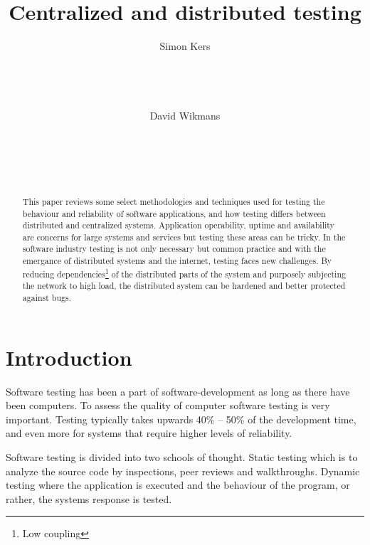 \documentclass[10pt]{sensys-abstract}
\author{
%
\alignauthor Simon Kers\\
   \email{\url{skers@kth.se}}\\
   \affaddr{School of Technology and Health}\\
   \affaddr{KTH Royal Institute of Technology}\\
   \affaddr{February 2013}\\
\alignauthor David Wikmans\\
   \email{\url{wikmans@kth.se}}\\
   \affaddr{School of Technology and Health}\\
   \affaddr{KTH Royal Institute of Technology}\\
   \affaddr{February 2013}\\
}
\title{Centralized and distributed testing}
\begin{document}
\maketitle

\begin{abstract}
\noindent
This paper reviews some select methodologies and techniques used for testing the behaviour and reliability of software applications, and how testing differs between distributed and centralized systems.
Application operability, uptime and availability are concerns for large systems and services but testing these areas can be tricky.
In the software industry testing is not only necessary but common practice and with the emergance of distributed systems and the internet, testing faces new challenges.
By reducing dependencies\footnote{Low coupling} of the distributed parts of the system and purposely subjecting the network to high load, the distributed system can be hardened and better protected against bugs.

\end{abstract}




\section{Introduction}
  \label{sec:intro}
\noindent
Software testing has been a part of software-development as long as there have been computers. To assess the quality of computer software testing is very important. Testing typically takes upwards 40\% -- 50\% of the development time, and even more for systems that require higher levels of reliability. \cite{testing_techniques}

Software testing is divided into two schools of thought. Static testing which is to analyze the source code by inspections, peer reviews and walkthroughs. Dynamic testing where the application is executed and the behaviour of the program, or rather, the systems response is tested.
\end{document}
